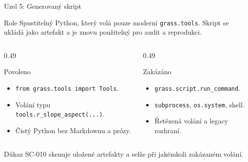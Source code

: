 \documentclass[aspectratio=169,11pt]{beamer}
\begin{document}
\begin{frame}[t]{Uzel 5: Generovaný skript}
  \small
  \begin{block}{Role}
    Spustitelný Python, který volá pouze moderní \texttt{grass.tools}. Skript
    se ukládá jako artefakt a je znovu použitelný pro audit a reprodukci.
  \end{block}

  \begin{columns}[T,onlytextwidth]
    \begin{column}{0.49\textwidth}
      \begin{block}{Povoleno}
        \begin{itemize}
          \item \texttt{from grass.tools import Tools}.
          \item Volání typu \texttt{tools.r\_slope\_aspect(...)}.
          \item Čistý Python bez Markdownu a prózy.
        \end{itemize}
      \end{block}
    \end{column}
    \begin{column}{0.49\textwidth}
      \begin{block}{Zakázáno}
        \begin{itemize}
          \item \texttt{grass.script.run\_command}.
          \item \texttt{subprocess}, \texttt{os.system}, shell.
          \item Řetězená volání a legacy rozhraní.
        \end{itemize}
      \end{block}
    \end{column}
  \end{columns}

  \begin{alertblock}{Důkaz}
    SC-010 skenuje uložené artefakty a selže při jakémkoli zakázaném volání.
  \end{alertblock}
\end{frame}
\end{document}
